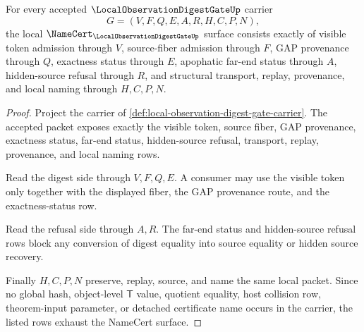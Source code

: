 \begin{theorem}
\label{thm:local-observation-digest-gate-obligations}
For every accepted $\LocalObservationDigestGateUp$ carrier
$$
G=(V,F,Q,E,A,R,H,C,P,N),
$$
the local $\NameCert_{\LocalObservationDigestGateUp}$ surface consists exactly of visible token admission through $V$, source-fiber admission through $F$, GAP provenance through $Q$, exactness status through $E$, apophatic far-end status through $A$, hidden-source refusal through $R$, and structural transport, replay, provenance, and local naming through $H,C,P,N$.
\end{theorem}
\begin{proof}
Project the carrier of \autoref{def:local-observation-digest-gate-carrier}. The accepted packet exposes exactly the visible token, source fiber, GAP provenance, exactness status, far-end status, hidden-source refusal, transport, replay, provenance, and local naming rows.

Read the digest side through $V,F,Q,E$. A consumer may use the visible token only together with the displayed fiber, the GAP provenance route, and the exactness-status row.

Read the refusal side through $A,R$. The far-end status and hidden-source refusal rows block any conversion of digest equality into source equality or hidden source recovery.

Finally $H,C,P,N$ preserve, replay, source, and name the same local packet. Since no global hash, object-level $\mathsf{T}$ value, quotient equality, host collision row, theorem-input parameter, or detached certificate name occurs in the carrier, the listed rows exhaust the NameCert surface.
\end{proof}

